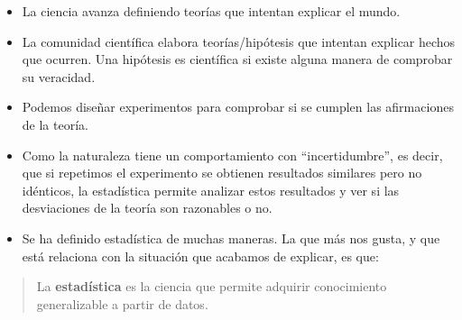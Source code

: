 \documentclass[
  letterpaper,
  DIV=11,
  numbers=noendperiod]{scrreprt}
\begin{document}
\begin{itemize}
\item
  La ciencia avanza definiendo teorías que intentan explicar el mundo.
\item
  La comunidad científica elabora teorías/hipótesis que intentan
  explicar hechos que ocurren. Una hipótesis es científica si existe
  alguna manera de comprobar su veracidad.
\item
  Podemos diseñar experimentos para comprobar si se cumplen las
  afirmaciones de la teoría.
\item
  Como la naturaleza tiene un comportamiento con ``incertidumbre'', es
  decir, que si repetimos el experimento se obtienen resultados
  similares pero no idénticos, la estadística permite analizar estos
  resultados y ver si las desviaciones de la teoría son razonables o no.
\item
  Se ha definido estadística de muchas maneras. La que más nos gusta, y
  que está relaciona con la situación que acabamos de explicar, es que:
\end{itemize}

\begin{quote}
La \textbf{estadística} es la ciencia que permite adquirir conocimiento
generalizable a partir de datos.
\end{quote}
\end{document}

